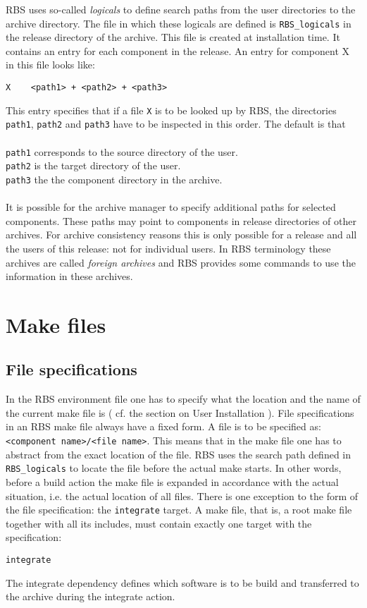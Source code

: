 RBS uses so-called {\em logicals} to define search paths from the user directories
to the archive directory. The file in which these logicals are defined
is \verb+RBS_logicals+ in the release directory of the archive. This file is created at installation time. It contains an entry for each 
component in the release. An entry for component X in this file looks like:
\begin{verbatim}
X    <path1> + <path2> + <path3>
\end{verbatim}
This entry specifies that if a file \verb+X+ is to be looked up by RBS, the 
directories \verb+path1+, \verb+path2+ and \verb+path3+
 have to be inspected in this order. The default is that\\
\\
\verb+path1+ corresponds to the source directory of the user.\\
\verb+path2+ is the target directory of the user.\\
\verb+path3+ the the component directory in the archive.\\
\\
It is possible for the archive manager to specify additional paths for
selected components. These paths may point to components in release directories
of other archives. For archive consistency reasons this is only possible for 
a release and all the users of this release: not for individual users. In RBS
terminology these archives are called {\em foreign archives} and RBS 
provides some commands to use the information in these archives.

\section{Make files}
\subsection{File specifications}

In the RBS environment file one has to specify what the location and
the name of the current make file is ( cf. the section on User Installation ).
File specifications in an RBS make file always have a fixed form. A file
is to be specified as:  \verb+<component name>/<file name>+.
This means that in the make file one has to abstract from the exact location
of the file. RBS uses the search path defined in \verb+RBS_logicals+
to locate the file before the actual make starts. In other words, before a
build action the make file is expanded in accordance with the actual
situation, i.e. the actual location of all files.
There is one exception to the form of the file specification: the 
\verb+integrate+
target. A make file, that is, a root make file together with all its includes,
must contain exactly one target with the specification:
\begin{verbatim}
integrate
\end{verbatim}
The integrate dependency defines which software is to be build and
transferred to the archive during the integrate action.

